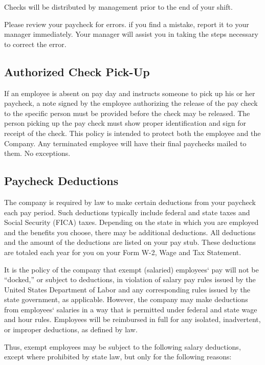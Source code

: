 \documentclass{book}
\begin{document}
Checks will be distributed by management prior to the end of your shift.

Please review your paycheck for errors. if you find a mistake, report it to your manager immediately. Your manager will assist you in taking the steps necessary to correct the error.

\subsection{Authorized Check Pick-Up}

If an employee is absent on pay day and instructs someone to pick up his or her paycheck, a note signed by the employee authorizing the release of the pay check to the specific person must be provided before the check may be released. The person picking up the pay check must show proper identification and sign for receipt of the check. This policy is intended to protect both the employee and the Company. Any terminated employee will have their final paychecks mailed to them. No exceptions.

\subsection{Paycheck Deductions}

The company is required by law to make certain deductions from your paycheck each pay period. Such deductions typically include federal and state taxes and Social Security (FICA) taxes. Depending on the state in which you are employed and the benefits you choose, there may be additional deductions. All deductions and the amount of the deductions are listed on your pay stub. These deductions are totaled each year for you on your Form W-2, Wage and Tax Statement.

It is the policy of the company that exempt (salaried) employees‘ pay will not be “docked,” or subject to deductions, in violation of salary pay rules issued by the United States Department of Labor and any corresponding rules issued by the state government, as applicable. However, the company may make deductions from employees‘ salaries in a way that is permitted under federal and state wage and hour rules. Employees will be reimbursed in full for any isolated, inadvertent, or improper deductions, as defined by law.

Thus, exempt employees may be subject to the following salary deductions, except where prohibited by state law, but only for the following reasons:
\end{document}
